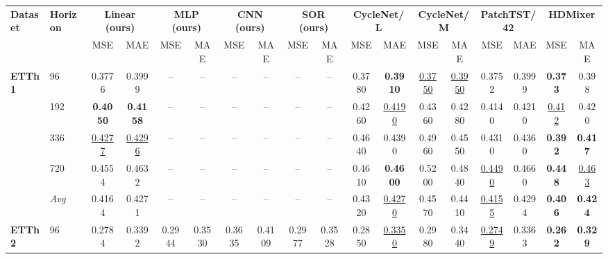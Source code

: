 \begin{tabular}{llcccccccccccccccc}
\toprule
\textbf{Dataset} & \textbf{Horizon} & \multicolumn{2}{c}{\textbf{Linear (ours)}} & \multicolumn{2}{c}{\textbf{MLP (ours)}} & \multicolumn{2}{c}{\textbf{CNN (ours)}} & \multicolumn{2}{c}{\textbf{SOR (ours)}} & \multicolumn{2}{c}{\textbf{CycleNet/L}} & \multicolumn{2}{c}{\textbf{CycleNet/M}} & \multicolumn{2}{c}{\textbf{PatchTST/42}} & \multicolumn{2}{c}{\textbf{HDMixer}} \\
\cmidrule(lr){3-4} \cmidrule(lr){5-6} \cmidrule(lr){7-8} \cmidrule(lr){9-10} \cmidrule(lr){11-12} \cmidrule(lr){13-14} \cmidrule(lr){15-16} \cmidrule(lr){17-18}
& & MSE & MAE & MSE & MAE & MSE & MAE & MSE & MAE & MSE & MAE & MSE & MAE & MSE & MAE & MSE & MAE \\
\midrule
\textbf{ETTh1} & 96         &         0.3776 &         0.3999 &             -- &             -- &             -- &             -- &             -- &             -- &         0.3780 & \textbf{0.3910} & \underline{0.3750} & \underline{0.3950} &         0.3752 &         0.3999 & \textbf{0.373} &          0.398 \\
               & 192        & \textbf{0.4050} & \textbf{0.4158} &             -- &             -- &             -- &             -- &             -- &             -- &         0.4260 & \underline{0.4190} &         0.4360 &         0.4280 &         0.4140 &         0.4210 & \underline{0.412} &          0.420 \\
               & 336        & \underline{0.4277} & \underline{0.4296} &             -- &             -- &             -- &             -- &             -- &             -- &         0.4640 &         0.4390 &         0.4960 &         0.4550 &         0.4310 &         0.4360 & \textbf{0.392} & \textbf{0.417} \\
               & 720        &         0.4554 &         0.4632 &             -- &             -- &             -- &             -- &             -- &             -- &         0.4610 & \textbf{0.4600} &         0.5200 &         0.4840 & \underline{0.4490} &         0.4660 & \textbf{0.448} & \underline{0.463} \\
               & \textit{Avg} &         0.4164 &         0.4271 &             -- &             -- &             -- &             -- &             -- &             -- &         0.4320 & \underline{0.4270} &         0.4570 &         0.4410 & \underline{0.4155} &         0.4294 & \textbf{0.406} & \textbf{0.424} \\
\midrule
\textbf{ETTh2} & 96         &         0.2784 &         0.3392 &         0.2944 &         0.3530 &         0.3635 &         0.4109 &         0.2977 &         0.3528 &         0.2850 & \underline{0.3350} &         0.2980 &         0.3440 & \underline{0.2749} &         0.3363 & \textbf{0.262} & \textbf{0.329} \\

\end{tabular}
